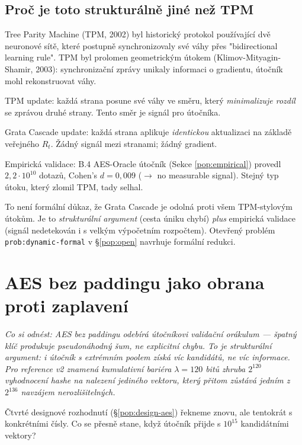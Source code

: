 \documentclass[11pt,a4paper]{article}
\begin{document}
\subsection{Proč je toto strukturálně jiné než TPM}

Tree Parity Machine (TPM, 2002) byl historický protokol používající dvě neuronové sítě, které postupně synchronizovaly své váhy přes "bidirectional learning rule". TPM byl prolomen geometrickým útokem (Klimov-Mityagin-Shamir, 2003): synchronizační zprávy unikaly informaci o gradientu, útočník mohl rekonstruovat váhy.

\begin{sidebar}
TPM update: každá strana posune své váhy ve směru, který \emph{minimalizuje rozdíl} se zprávou druhé strany. Tento směr je signál pro útočníka.

Grata Cascade update: každá strana aplikuje \emph{identickou} aktualizaci na základě veřejného $R_t$. Žádný signál mezi stranami; žádný gradient.

Empirická validace: B.4 AES-Oracle útočník (Sekce \ref{pop:empirical}) provedl $2{,}2 \cdot 10^{10}$ dotazů, Cohen's $d = 0{,}009$ ($\to$ no measurable signal). Stejný typ útoku, který zlomil TPM, tady selhal.
\end{sidebar}

To není formální důkaz, že Grata Cascade je odolná proti všem TPM-stylovým útokům. Je to \emph{strukturální argument} (cesta úniku chybí) \emph{plus} empirická validace (signál nedetekován i s velkým výpočetním rozpočtem). Otevřený problém \texttt{prob:dynamic-formal} v \S\ref{pop:open} navrhuje formální redukci.

\section{AES bez paddingu jako obrana proti zaplavení}\label{pop:aes}

\noindent\textit{Co si odnést: AES bez paddingu odebírá útočníkovi validační orákulum --- špatný klíč produkuje pseudonáhodný šum, ne explicitní chybu. To je strukturální argument: i útočník s extrémním poolem získá víc kandidátů, ne víc informace. Pro reference v2 znamená kumulativní bariéra $\lambda = 120$ bitů zhruba $2^{120}$ vyhodnocení hashe na nalezení jediného vektoru, který přitom zůstává jedním z $2^{136}$ navzájem nerozlišitelných.}

\medskip

Čtvrté designové rozhodnutí (§\ref{pop:design-aes}) řekneme znovu, ale tentokrát s konkrétními čísly. Co se přesně stane, když útočník přijde s $10^{15}$ kandidátními vektory?
\end{document}
